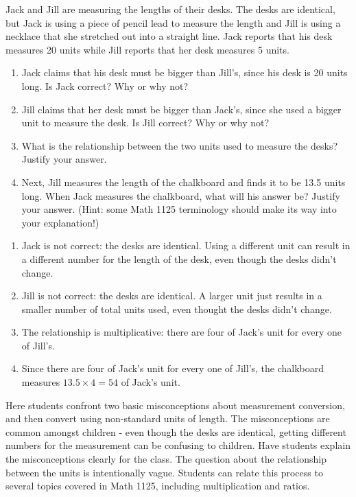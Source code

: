 \documentclass[handout]{ximera}
\begin{document}
\begin{problem}
    Jack and Jill are measuring the lengths of their desks.  The desks are identical, but Jack is using a piece of pencil lead to measure the length and Jill is using a necklace that she stretched out into a straight line.  Jack reports that his desk measures 20 units while Jill reports that her desk measures 5 units.
    \begin{enumerate}
        \item Jack claims that his desk must be bigger than Jill's, since his desk is 20 units long.  Is Jack correct?  Why or why not?
        \item Jill claims that her desk must be bigger than Jack's, since she used a bigger unit to measure the desk.  Is Jill correct?  Why or why not?
        \item What is the relationship between the two units used to measure the desks?  Justify your answer.
        \item Next, Jill measures the length of the chalkboard and finds it to be 13.5 units long.  When Jack measures the chalkboard, what will his answer be?  Justify your answer.  (Hint: some Math 1125 terminology should make its way into your explanation!)
    \end{enumerate}
    
    \begin{solution}
    \begin{enumerate}
    \item Jack is not correct: the desks are identical.  Using a different unit can result in a different number for the length of the desk, even though the desks didn't change.
    \item Jill is not correct: the desks are identical.  A larger unit just results in a smaller number of total units used, even thought the desks didn't change.
    \item The relationship is multiplicative: there are four of Jack's unit for every one of Jill's.
    \item Since there are four of Jack's unit for every one of Jill's, the chalkboard measures $13.5 \times 4 = 54$ of Jack's unit.
    \end{enumerate}
    \end{solution}
    
    \begin{instructorNotes}
    Here students confront two basic misconceptions about measurement conversion, and then convert using non-standard units of length.  The misconceptions are common amongst children - even though the desks are identical, getting different numbers for the measurement can be confusing to children.  Have students explain the misconceptions clearly for the class.  The question about the relationship between the units is intentionally vague.  Students can relate this process to several topics covered in Math 1125, including multiplication and ratios.
    \end{instructorNotes}
\end{problem}
\end{document}
